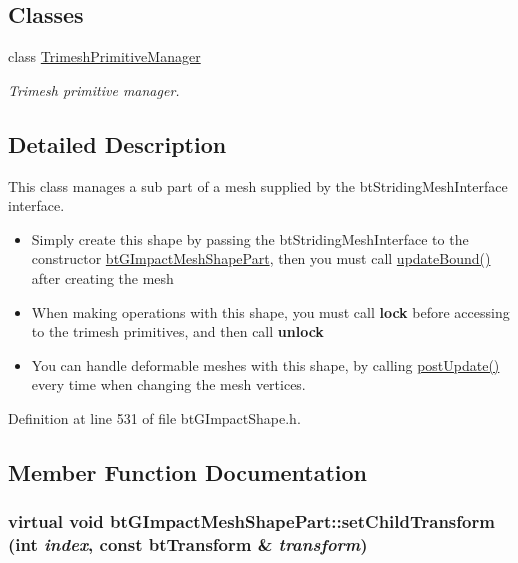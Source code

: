 \subsection*{Classes}
\begin{CompactItemize}
\item 
class \hyperlink{classbt_g_impact_mesh_shape_part_1_1_trimesh_primitive_manager}{TrimeshPrimitiveManager}
\begin{CompactList}\small\item\em Trimesh primitive manager. \item\end{CompactList}\end{CompactItemize}


\subsection{Detailed Description}
This class manages a sub part of a mesh supplied by the btStridingMeshInterface interface. 

\begin{itemize}
\item Simply create this shape by passing the btStridingMeshInterface to the constructor \hyperlink{classbt_g_impact_mesh_shape_part}{btGImpactMeshShapePart}, then you must call \hyperlink{classbt_g_impact_shape_interface_cb26c2d7a2aecabd06b996b72b848492}{updateBound()} after creating the mesh\item When making operations with this shape, you must call {\bf lock} before accessing to the trimesh primitives, and then call {\bf unlock}\item You can handle deformable meshes with this shape, by calling \hyperlink{classbt_g_impact_shape_interface_c430754948ac92d6f70b81e88416c96a}{postUpdate()} every time when changing the mesh vertices. \end{itemize}


Definition at line 531 of file btGImpactShape.h.

\subsection{Member Function Documentation}
\hypertarget{classbt_g_impact_mesh_shape_part_0a97d3769fb7d3f583e41da6b284bcc1}{
\subsubsection[setChildTransform]{\setlength{\rightskip}{0pt plus 5cm}virtual void btGImpactMeshShapePart::setChildTransform (int {\em index}, \/  const btTransform \& {\em transform})}}
\label{classbt_g_impact_mesh_shape_part_0a97d3769fb7d3f583e41da6b284bcc1}


